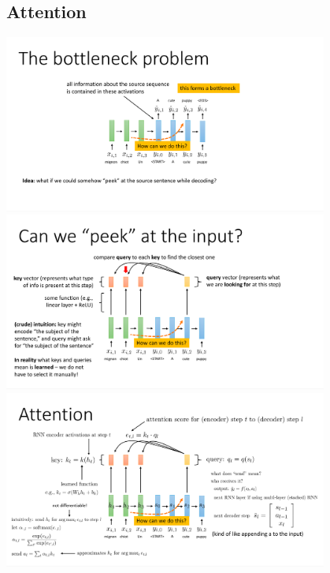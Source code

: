 \documentclass{book}
\begin{document}
\begin{figure}[H]
    \subsection{Attention}
    \includegraphics[width=0.95\textwidth]{images/lec11_15.png}
    \includegraphics[width=0.95\textwidth]{images/lec11_16.png}
    \includegraphics[width=0.95\textwidth]{images/lec11_17.png}
\end{figure}
\end{document}
